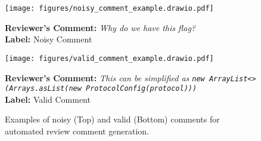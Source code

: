 \begin{figure}[]
\begin{minipage}{0.49\textwidth}

    \texttt{[image: figures/noisy\_comment\_example.drawio.pdf]}

\begin{small}
\textbf{Reviewer's Comment:} \textit{Why do we have this flag?} \\
\textbf{Label:} Noisy Comment 
 
\end{small}
\end{minipage}

\begin{minipage}{0.49\textwidth}
 \texttt{[image: figures/valid\_comment\_example.drawio.pdf]}
\begin{small}
\textbf{Reviewer's Comment:} \textit{This can be simplified as  \lstinline|new ArrayList<>(Arrays.asList(new ProtocolConfig(protocol)))|} \\
\textbf{Label:} Valid Comment
\end{small}
\end{minipage}

\caption{Examples of noisy (Top)  and valid (Bottom) comments for automated review comment generation.}
\label{fig:code_reviews_stacked}
\end{figure}

